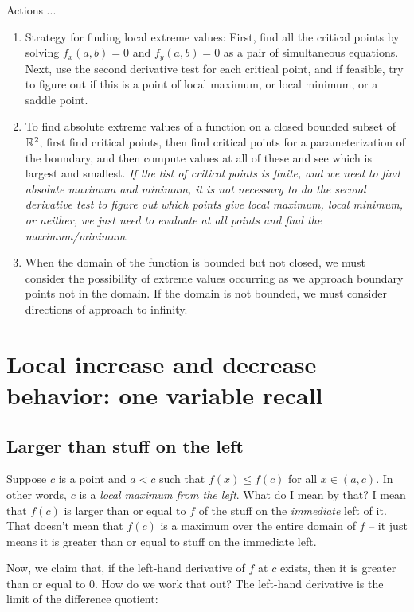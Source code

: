 \documentclass[10pt]{amsart}
\begin{document}
Actions ...

\begin{enumerate}
\item Strategy for finding local extreme values: First, find all the
  critical points by solving $f_x(a,b) = 0$ and $f_y(a,b) = 0$ as a
  pair of simultaneous equations. Next, use the second derivative test
  for each critical point, and if feasible, try to figure out if this
  is a point of local maximum, or local minimum, or a saddle point.
\item To find absolute extreme values of a function on a closed
  bounded subset of $\mathbb{R}^2$, first find critical points, then find
  critical points for a parameterization of the boundary, and then
  compute values at all of these and see which is largest and
  smallest. {\em If the list of critical points is finite, and we need
  to find absolute maximum and minimum, it is not necessary to do the
  second derivative test to figure out which points give local
  maximum, local minimum, or neither, we just need to evaluate at all
  points and find the maximum/minimum}.
\item When the domain of the function is bounded but not closed, we
  must consider the possibility of extreme values occurring as we
  approach boundary points not in the domain. If the domain is not
  bounded, we must consider directions of approach to infinity.
\end{enumerate}

\section{Local increase and decrease behavior: one variable recall}

\subsection{Larger than stuff on the left}

Suppose $c$ is a point and $a < c$ such that $f(x) \le f(c)$ for all
$x \in (a,c)$. In other words, $c$ is a {\em local maximum from the
left}. What do I mean by that? I mean that $f(c)$ is larger than or
equal to $f$ of the stuff on the {\em immediate} left of it. That
doesn't mean that $f(c)$ is a maximum over the entire domain of $f$ --
it just means it is greater than or equal to stuff on the immediate
left.

Now, we claim that, if the left-hand derivative of $f$ at $c$ exists,
then it is greater than or equal to $0$. How do we work that out? The
left-hand derivative is the limit of the difference quotient:
\end{document}
